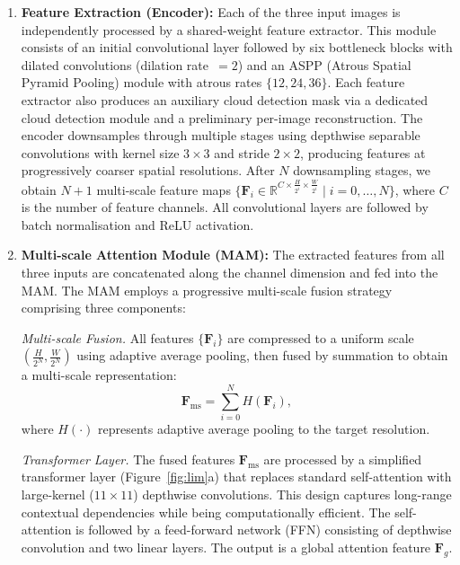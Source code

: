 \documentclass[12pt,a4paper]{article}
\begin{document}
\begin{enumerate}[leftmargin=2em]
    \item \textbf{Feature Extraction (Encoder):} Each of the three input images is independently processed by a shared-weight feature extractor. This module consists of an initial convolutional layer followed by six bottleneck blocks with dilated convolutions (dilation rate~$= 2$) and an ASPP (Atrous Spatial Pyramid Pooling) module with atrous rates $\{12, 24, 36\}$. Each feature extractor also produces an auxiliary cloud detection mask via a dedicated cloud detection module and a preliminary per-image reconstruction. The encoder downsamples through multiple stages using depthwise separable convolutions with kernel size $3 \times 3$ and stride $2 \times 2$, producing features at progressively coarser spatial resolutions. After $N$ downsampling stages, we obtain $N+1$ multi-scale feature maps $\{\mathbf{F}_i \in \mathbb{R}^{C \times \frac{H}{2^i} \times \frac{W}{2^i}} \mid i = 0, \ldots, N\}$, where $C$ is the number of feature channels. All convolutional layers are followed by batch normalisation and ReLU activation.
    
    \item \textbf{Multi-scale Attention Module (MAM):} The extracted features from all three inputs are concatenated along the channel dimension and fed into the MAM. The MAM employs a progressive multi-scale fusion strategy comprising three components:
    
    \textit{Multi-scale Fusion.} All features $\{\mathbf{F}_i\}$ are compressed to a uniform scale $(\frac{H}{2^N}, \frac{W}{2^N})$ using adaptive average pooling, then fused by summation to obtain a multi-scale representation:
    \begin{equation}
        \mathbf{F}_{\text{ms}} = \sum_{i=0}^{N} H(\mathbf{F}_i),
    \end{equation}
    where $H(\cdot)$ represents adaptive average pooling to the target resolution.
    
    \textit{Transformer Layer.} The fused features $\mathbf{F}_{\text{ms}}$ are processed by a simplified transformer layer (Figure~\ref{fig:lim}a) that replaces standard self-attention with large-kernel ($11\times11$) depthwise convolutions. This design captures long-range contextual dependencies while being computationally efficient. The self-attention is followed by a feed-forward network (FFN) consisting of depthwise convolution and two linear layers. The output is a global attention feature $\mathbf{F}_g$.
    

\end{enumerate}
\end{document}
